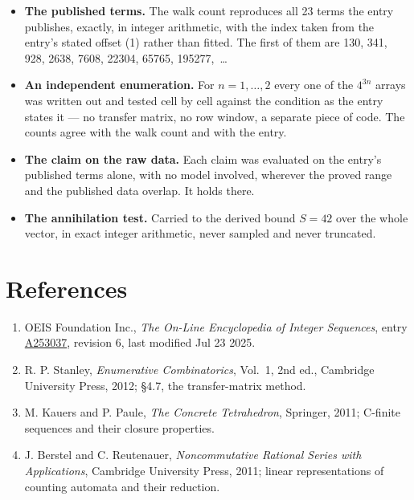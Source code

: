 \documentclass[11pt]{article}
\theoremstyle{definition}
\begin{document}
\begin{itemize}

\item {\bfseries The published terms.} The walk count reproduces all 23 terms the entry publishes, exactly, in integer arithmetic, with the index taken from the entry's stated offset (1) rather than fitted. The first of them are 130, 341, 928, 2638, 7608, 22304, 65765, 195277,~\dots

\item {\bfseries An independent enumeration.} For $n = 1,\dots,2$ every one of the $4^{3n}$ arrays was written out and tested cell by cell against the condition as the entry states it --- no transfer matrix, no row window, a separate piece of code. The counts agree with the walk count and with the entry.

\item {\bfseries The claim on the raw data.} Each claim was evaluated on the entry's published terms alone, with no model involved, wherever the proved range and the published data overlap. It holds there.

\item {\bfseries The annihilation test.} Carried to the derived bound $S = 42$ over the whole vector, in exact integer arithmetic, never sampled and never truncated.

\end{itemize}

\section{References}

\begin{enumerate}

\item OEIS Foundation Inc., \emph{The On-Line Encyclopedia of Integer Sequences}, entry \href{https://oeis.org/A253037}{A253037}, revision 6, last modified Jul 23 2025.

\item R. P. Stanley, \emph{Enumerative Combinatorics}, Vol.~1, 2nd ed., Cambridge University Press, 2012; \S4.7, the transfer-matrix method.

\item M. Kauers and P. Paule, \emph{The Concrete Tetrahedron}, Springer, 2011; C-finite sequences and their closure properties.

\item J. Berstel and C. Reutenauer, \emph{Noncommutative Rational Series with Applications}, Cambridge University Press, 2011; linear representations of counting automata and their reduction.

\end{enumerate}
\end{document}
